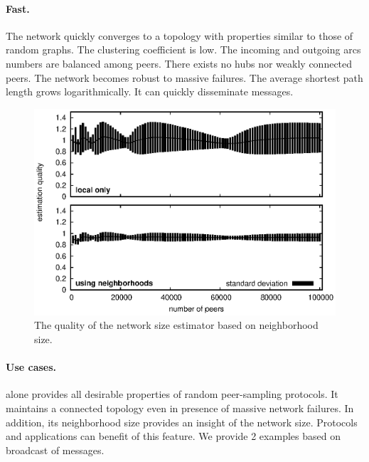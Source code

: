 \paragraph{Fast.}
The network quickly converges to a topology with properties similar to those of
random graphs. The clustering coefficient is low. The incoming and outgoing arcs
numbers are balanced among peers. There exists no hubs nor weakly connected
peers. The network becomes robust to massive failures. The average shortest path
length grows logarithmically. It can quickly disseminate messages.


\begin{figure}
  \begin{center}
    \includegraphics[width=\SCALE\textwidth]{./img/estimator.eps}
    \caption{\label{fig:estimator} The quality of the network size estimator
      based on neighborhood size.}
  \end{center}
\end{figure}

\paragraph{Use cases.} \SPRAY alone provides all desirable properties of random
peer-sampling protocols. It maintains a connected topology even in presence of
massive network failures. In addition, its neighborhood size provides an insight
of the network size. Protocols and applications can benefit of this feature. We
provide 2 examples based on broadcast of messages.


